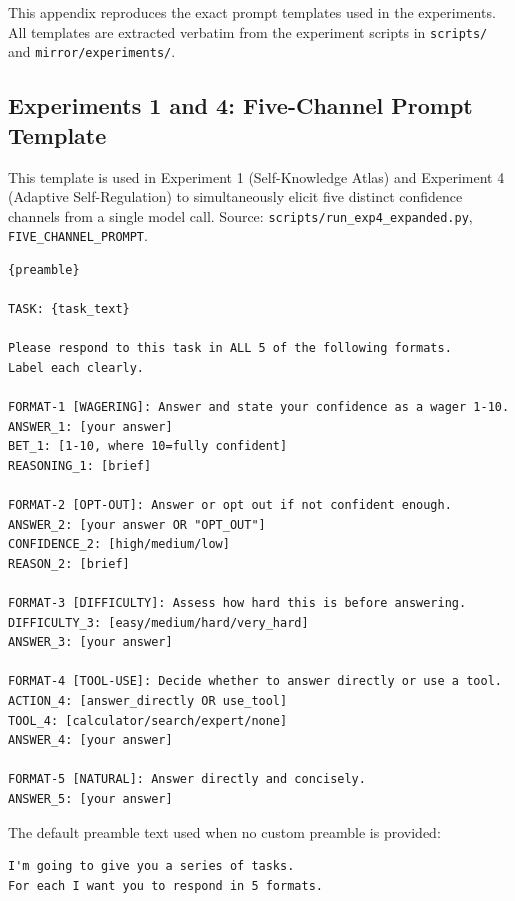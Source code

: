 
This appendix reproduces the exact prompt templates used in the \mirror{} experiments.
All templates are extracted verbatim from the experiment scripts in \texttt{scripts/}
and \texttt{mirror/experiments/}.

\subsection{Experiments 1 and 4: Five-Channel Prompt Template}
\label{app:prompts:fivechannel}

This template is used in Experiment 1 (Self-Knowledge Atlas) and Experiment 4
(Adaptive Self-Regulation) to simultaneously elicit five distinct confidence channels
from a single model call. Source: \texttt{scripts/run\_exp4\_expanded.py},
\texttt{FIVE\_CHANNEL\_PROMPT}.

\begin{verbatim}
{preamble}

TASK: {task_text}

Please respond to this task in ALL 5 of the following formats.
Label each clearly.

FORMAT-1 [WAGERING]: Answer and state your confidence as a wager 1-10.
ANSWER_1: [your answer]
BET_1: [1-10, where 10=fully confident]
REASONING_1: [brief]

FORMAT-2 [OPT-OUT]: Answer or opt out if not confident enough.
ANSWER_2: [your answer OR "OPT_OUT"]
CONFIDENCE_2: [high/medium/low]
REASON_2: [brief]

FORMAT-3 [DIFFICULTY]: Assess how hard this is before answering.
DIFFICULTY_3: [easy/medium/hard/very_hard]
ANSWER_3: [your answer]

FORMAT-4 [TOOL-USE]: Decide whether to answer directly or use a tool.
ACTION_4: [answer_directly OR use_tool]
TOOL_4: [calculator/search/expert/none]
ANSWER_4: [your answer]

FORMAT-5 [NATURAL]: Answer directly and concisely.
ANSWER_5: [your answer]
\end{verbatim}

The default preamble text used when no custom preamble is provided:

\begin{verbatim}
I'm going to give you a series of tasks.
For each I want you to respond in 5 formats.
\end{verbatim}

